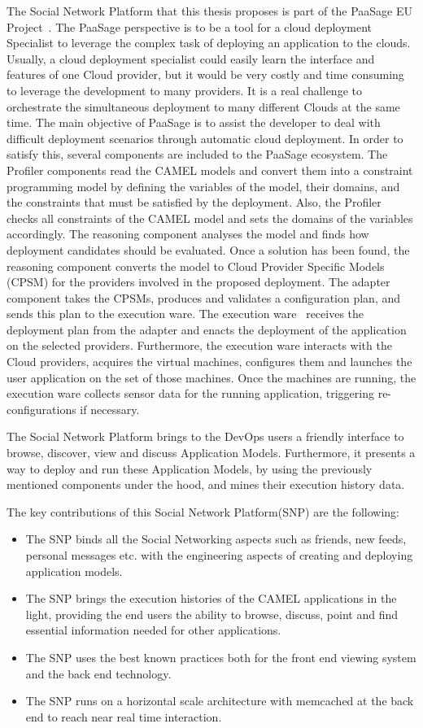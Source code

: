 The Social Network Platform that this thesis proposes is part of the PaaSage EU Project~\cite{paasage}.
The PaaSage perspective is to be a tool for a cloud deployment Specialist to leverage the complex task of deploying an application to the clouds. Usually, a cloud deployment specialist could easily learn the interface and features of one Cloud provider, but it would be very costly and time consuming to leverage the development to many providers. It is a real challenge to orchestrate the simultaneous deployment to many different Clouds at the same time. The main objective of PaaSage is to assist the developer to deal with difficult deployment scenarios through automatic cloud deployment. In order to satisfy this, several components are included to the PaaSage ecosystem. The Profiler components read the CAMEL models and convert them into a constraint programming model by defining the variables of the model, their domains, and the constraints that must be satisfied by the deployment. Also, the Profiler checks all constraints of the CAMEL model and sets the domains of the variables accordingly. The reasoning component analyses the model and finds how deployment candidates should be evaluated. Once a solution has been found, the reasoning component converts the model to Cloud Provider Specific Models (CPSM) for the providers involved in the proposed deployment. The adapter component takes the CPSMs, produces and validates a configuration plan, and sends this plan to the execution ware. The execution ware~\cite{baur2014towards} receives the deployment plan from the adapter and enacts the deployment of the application on the selected providers. Furthermore, the execution ware interacts with the Cloud providers, acquires the virtual machines, configures them and launches the user application on the set of those machines. Once the machines are running, the execution ware collects sensor data for the running application, triggering re-configurations if necessary.

The Social Network Platform brings to the DevOps users a friendly interface to browse, discover, view and discuss Application Models. Furthermore, it presents a way to deploy and run these Application Models, by using the previously mentioned components under the hood, and mines their execution history data.

The key contributions of this Social Network Platform(SNP) are the following:
\begin{itemize}
\item The SNP binds all the Social Networking aspects such as friends, new feeds, personal messages etc. with the engineering aspects of creating and deploying application models.
\item The SNP brings the execution histories of the CAMEL applications in the light, providing the end users the ability to browse, discuss, point and find essential information needed for other applications.
\item The SNP uses the best known practices both for the front end viewing system and the back end technology.
\item The SNP runs on a horizontal scale architecture with memcached at the back end to reach near real time interaction. 
\end{itemize}



